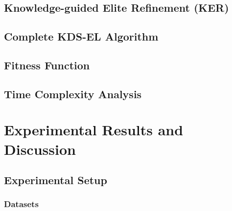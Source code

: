 \subsection{Knowledge-guided Elite Refinement (KER)}
%
%
%
%

\subsection{Complete KDS-EL Algorithm}

\subsection{Fitness Function}

\subsection{Time Complexity Analysis}


\section{Experimental Results and Discussion}

\subsection{Experimental Setup}

\subsubsection{Datasets}

